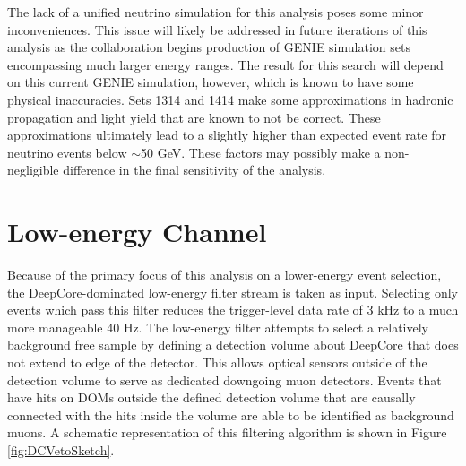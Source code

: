 \documentclass{gatech-thesis}
\begin{document}
The lack of a unified neutrino simulation for this analysis poses some minor inconveniences. This issue will likely be addressed in future iterations of this analysis as the collaboration begins production of GENIE simulation sets encompassing much larger energy ranges. The result for this search will depend on this current GENIE simulation, however,  which is known to have some physical inaccuracies. Sets 1314 and 1414 make some approximations in hadronic propagation and light yield that are known to not be correct. These approximations ultimately lead to a slightly higher than expected event rate for neutrino events below $\sim$50 GeV. These factors may possibly make a non-negligible difference in the final sensitivity of the analysis.

\section{Low-energy Channel}

Because of the primary focus of this analysis on a lower-energy event selection, the DeepCore-dominated low-energy filter stream is taken as input. Selecting only events which pass this filter reduces the trigger-level data rate of 3 kHz to a much more manageable 40 Hz. The low-energy filter attempts to select a relatively background free sample by defining a detection volume about DeepCore that does not extend to edge of the detector. This allows optical sensors outside of the detection volume to serve as dedicated downgoing muon detectors. Events that have hits on DOMs outside the defined detection volume that are causally connected with the hits inside the volume are able to be identified as background muons. A schematic representation of this filtering algorithm is shown in Figure \ref{fig:DCVetoSketch}. 
\end{document}
